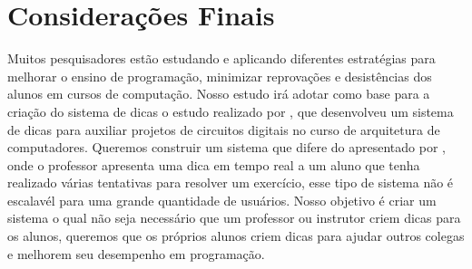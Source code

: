 \section{Considerações Finais}

Muitos pesquisadores estão estudando e aplicando diferentes estratégias para melhorar o ensino de programação, minimizar reprovações e desistências dos alunos em cursos de computação. Nosso estudo irá adotar como base para a criação do sistema de dicas o estudo realizado por , que desenvolveu um sistema de dicas para auxiliar projetos de circuitos digitais no curso de arquitetura de computadores. Queremos construir um sistema que difere do apresentado por , onde o professor apresenta uma dica em tempo real a um aluno que tenha realizado várias tentativas para resolver um exercício, esse tipo de sistema não é escalavél para uma grande quantidade de usuários. Nosso objetivo é criar um sistema o qual não seja necessário que um professor ou instrutor criem dicas para os alunos, queremos que os próprios alunos criem dicas para ajudar outros colegas e melhorem seu desempenho em programação.
